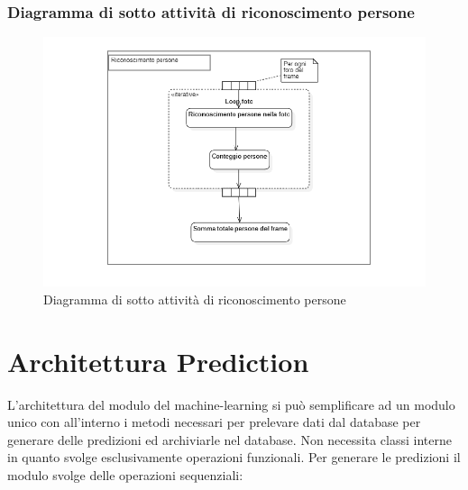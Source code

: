 \subsubsection{Diagramma di sotto attività di riconoscimento persone}\label{DiagrammaSottoAttivitaRiconoscimentoPersone}
\begin{center}
	\begin{figure}[H]
		\centering\includegraphics[scale=0.8]
    {../immagini/diag_PB/conta_persone.png}
		\caption{Diagramma di sotto attività di riconoscimento persone}
	\end{figure}
\end{center}


\section{Architettura Prediction}\label{ArchitetturaDelProdottoPrediction}
L'architettura del modulo del machine-learning si può semplificare ad un modulo unico con all'interno i metodi necessari per prelevare dati dal database per generare delle predizioni ed archiviarle nel database.
Non necessita classi interne in quanto svolge esclusivamente operazioni funzionali. Per generare le predizioni il modulo svolge delle operazioni sequenziali:

